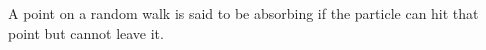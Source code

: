 A point on a random walk is said to be absorbing if the particle
can hit that point but cannot leave it.